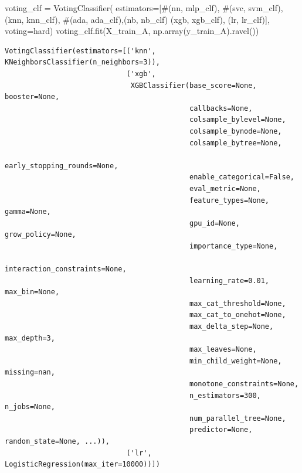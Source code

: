 \documentclass[
  letterpaper,
  DIV=11,
  numbers=noendperiod]{scrartcl}
\newenvironment{Shaded}{\begin{snugshade}}{\end{snugshade}}
\newcommand{\CommentTok}[1]{\textcolor[rgb]{0.37,0.37,0.37}{#1}}
\newcommand{\NormalTok}[1]{\textcolor[rgb]{0.00,0.23,0.31}{#1}}
\newcommand{\OperatorTok}[1]{\textcolor[rgb]{0.37,0.37,0.37}{#1}}
\newcommand{\StringTok}[1]{\textcolor[rgb]{0.13,0.47,0.30}{#1}}
\begin{document}
\begin{Shaded}
\begin{Highlighting}[]
\NormalTok{voting\_clf }\OperatorTok{=}\NormalTok{ VotingClassifier(}
\NormalTok{  estimators}\OperatorTok{=}\NormalTok{[}\CommentTok{\#(\textquotesingle{}nn\textquotesingle{}, mlp\_clf),}
              \CommentTok{\#(\textquotesingle{}svc\textquotesingle{}, svm\_clf),}
\NormalTok{              (}\StringTok{\textquotesingle{}knn\textquotesingle{}}\NormalTok{, knn\_clf), }\CommentTok{\#(\textquotesingle{}ada\textquotesingle{}, ada\_clf),(\textquotesingle{}nb\textquotesingle{}, nb\_clf)}
\NormalTok{              (}\StringTok{\textquotesingle{}xgb\textquotesingle{}}\NormalTok{, xgb\_clf), (}\StringTok{\textquotesingle{}lr\textquotesingle{}}\NormalTok{, lr\_clf)],}
\NormalTok{  voting}\OperatorTok{=}\StringTok{\textquotesingle{}hard\textquotesingle{}}\NormalTok{)}
\NormalTok{voting\_clf.fit(X\_train\_A, np.array(y\_train\_A).ravel())}
\end{Highlighting}
\end{Shaded}

\begin{verbatim}
VotingClassifier(estimators=[('knn', KNeighborsClassifier(n_neighbors=3)),
                             ('xgb',
                              XGBClassifier(base_score=None, booster=None,
                                            callbacks=None,
                                            colsample_bylevel=None,
                                            colsample_bynode=None,
                                            colsample_bytree=None,
                                            early_stopping_rounds=None,
                                            enable_categorical=False,
                                            eval_metric=None,
                                            feature_types=None, gamma=None,
                                            gpu_id=None, grow_policy=None,
                                            importance_type=None,
                                            interaction_constraints=None,
                                            learning_rate=0.01, max_bin=None,
                                            max_cat_threshold=None,
                                            max_cat_to_onehot=None,
                                            max_delta_step=None, max_depth=3,
                                            max_leaves=None,
                                            min_child_weight=None, missing=nan,
                                            monotone_constraints=None,
                                            n_estimators=300, n_jobs=None,
                                            num_parallel_tree=None,
                                            predictor=None, random_state=None, ...)),
                             ('lr', LogisticRegression(max_iter=10000))])
\end{verbatim}
\end{document}
